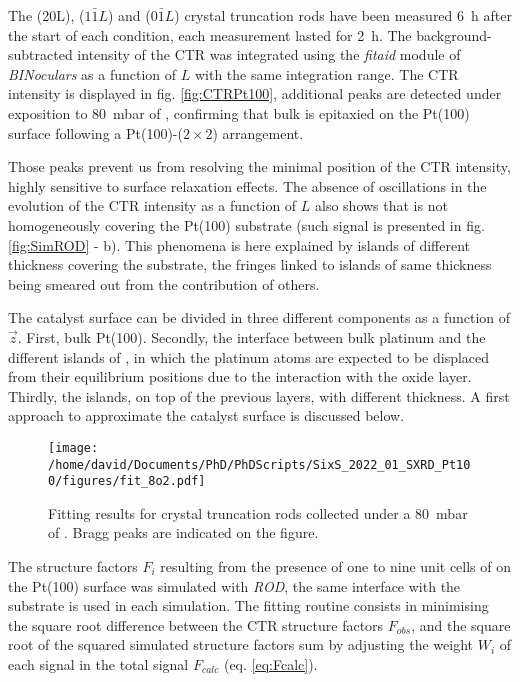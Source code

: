 The (20L), ($1\bar{1}L$) and (0$\bar{1}L$) crystal truncation rods have been measured \qty{6}{\hour} after the start of each condition, each measurement lasted for \qty{2}{\hour}.
The background-subtracted intensity of the CTR was integrated using the \textit{fitaid} module of \textit{BINoculars} as a function of $L$ with the same integration range.
The CTR intensity is displayed in fig. \ref{fig:CTRPt100}, additional peaks are detected under exposition to \qty{80}{\milli\bar} of , confirming that bulk  is epitaxied on the Pt(100) surface following a Pt(100)-($2\times2$) arrangement.

Those peaks prevent us from resolving the minimal position of the CTR intensity, highly sensitive to surface relaxation effects.
The absence of oscillations in the evolution of the CTR intensity as a function of $L$ also shows that  is not homogeneously covering the Pt(100) substrate (such signal is presented in fig. \ref{fig:SimROD} - b).
This phenomena is here explained by  islands of different thickness covering the substrate, the fringes linked to islands of same thickness being smeared out from the contribution of others.

The catalyst surface can be divided in three different components as a function of $\vec{z}$.
First, bulk Pt(100).
Secondly, the interface between bulk platinum and the different islands of , in which the platinum atoms are expected to be displaced from their equilibrium positions due to the interaction with the oxide layer.
Thirdly, the  islands, on top of the previous layers, with different thickness.
A first approach to approximate the catalyst surface is discussed below.

\begin{figure}[!htb]
    \centering
    \texttt{[image: /home/david/Documents/PhD/PhDScripts/SixS\_2022\_01\_SXRD\_Pt100/figures/fit\_8o2.pdf]}
    \caption{
        Fitting results for crystal truncation rods collected under a \qty{80}{\milli\bar} of .
         Bragg peaks are indicated on the figure.
    }
    \label{fig:CTRFitHighOxygen}
\end{figure}

The structure factors $F_i$ resulting from the presence of one to nine unit cells of  on the Pt(100) surface was simulated with \textit{ROD}, the same interface with the substrate is used in each simulation.
The fitting routine consists in minimising the square root difference between the CTR structure factors $F_{obs}$, and the square root of the squared simulated structure factors sum by adjusting the weight $W_i$ of each signal in the total signal $F_{calc}$ (eq. \ref{eq:Fcalc}).

